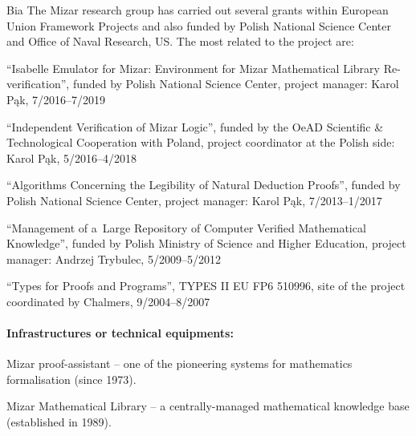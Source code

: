 \begin{sitedescription}{Bia}
The Mizar research group has carried out several grants within European Union Framework Projects 
and also funded by Polish National Science Center and Office of Naval Research, US.
The most related to the project are:

\begin{compactitem}
\item ``Isabelle Emulator for Mizar: Environment for Mizar Mathematical Library Re-verification'',
funded by Polish National Science Center, project manager: Karol Pąk, 7/2016--7/2019
\item ``Independent Verification of Mizar Logic'', funded by the OeAD Scientific \& Technological Cooperation with Poland,
project coordinator at the Polish side: Karol Pąk, 5/2016--4/2018
\item ``Algorithms Concerning the Legibility of Natural Deduction Proofs'', funded by Polish National Science Center,
project manager: Karol Pąk, 7/2013--1/2017
\item ``Management of a~Large Repository of Computer Verified Mathematical Knowledge'',
funded by Polish Ministry of Science and Higher Education, project manager: Andrzej Trybulec, 5/2009--5/2012
\item ``Types for Proofs and Programs'', TYPES II EU FP6 510996,
site of the project coordinated by Chalmers, 9/2004--8/2007
\end{compactitem}



\paragraph*{Infrastructures or technical equipments:}

\begin{compactitem} 
\item Mizar proof-assistant -- one of the pioneering systems for mathematics formalisation (since 1973).
\item Mizar Mathematical Library -- a centrally-managed mathematical knowledge base (established in 1989).
\end{compactitem}


\end{sitedescription}
